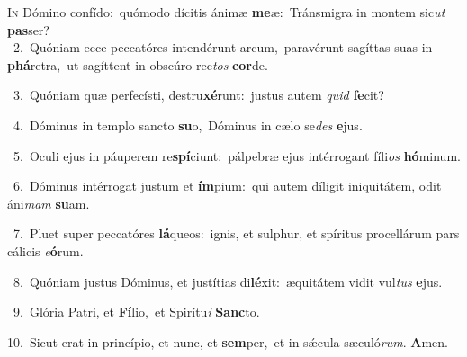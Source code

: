 \lettrine{\initial\textcolor{\initialcolor}{I}}{n} Dómino confído:~\dagger quómodo dícitis ánimæ \textbf{me}\-æ:~\star Tránsmigra in montem sic\textit{ut} \textbf{pas}\-ser?\\
{\numbfont\textcolor{\numbcolor}{~2.}}~Quóniam ecce peccatóres intendérunt arcum,~\dagger paravérunt sagíttas suas in \textbf{phá}\-retra,~\star ut sagíttent in obscúro rec\textit{tos} \textbf{cor}\-de.\par
{\numbfont\textcolor{\numbcolor}{~3.}}~Quóniam quæ perfecísti, destru\-\textbf{xé}\-runt:~\star justus autem \textit{quid} \textbf{fe}\-cit?\par
{\numbfont\textcolor{\numbcolor}{~4.}}~Dóminus in templo sancto \textbf{su}\-o,~\star Dóminus in cælo se\textit{des} \textbf{e}\-jus.\par
{\numbfont\textcolor{\numbcolor}{~5.}}~Oculi ejus in páuperem re\-\textbf{spí}\-ciunt:~\star pálpebræ ejus intérrogant fíli\textit{os} \textbf{hó}\-minum.\par
{\numbfont\textcolor{\numbcolor}{~6.}}~Dóminus intérrogat justum et \textbf{ím}\-pium:~\star qui autem díligit iniquitátem, odit áni\textit{mam} \textbf{su}\-am.\par
{\numbfont\textcolor{\numbcolor}{~7.}}~Pluet super peccatóres \textbf{lá}\-queos:~\star ignis, et sulphur, et spíritus procellárum pars cálicis \textit{e}\-\textbf{ó}rum.\par
{\numbfont\textcolor{\numbcolor}{~8.}}~Quóniam justus Dóminus, et justítias di\-\textbf{lé}\-xit:~\star æquitátem vidit vul\textit{tus} \textbf{e}\-jus.\par
{\numbfont\textcolor{\numbcolor}{~9.}}~Glória Patri, et \textbf{Fí}\-lio,~\star et Spirítu\textit{i} \textbf{Sanc}\-to.\par
{\numbfont\textcolor{\numbcolor}{10.}}~Sicut erat in princípio, et nunc, et \textbf{sem}\-per,~\star et in sǽcula sæculó\-\textit{rum}\-. \textbf{A}\-men.\par
